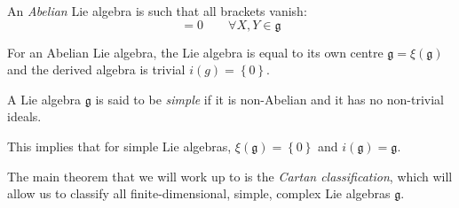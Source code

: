 \begin{definition}
  An \emph{Abelian} Lie algebra is such that all brackets vanish:
  \begin{equation}
    [X, Y] = 0 \qquad \forall X, Y \in \mathfrak{g}
  \end{equation}
\end{definition}

For an Abelian Lie algebra, the Lie algebra is equal to its own centre $\mathfrak{g} = \xi(\mathfrak{g})$ and the derived algebra is trivial $i(g) = \left\{ 0 \right\}$.

\begin{definition}[simple]
  A Lie algebra $\mathfrak{g}$ is said to be \emph{simple} if it is non-Abelian and it has no non-trivial ideals.
\end{definition}
This implies that for simple Lie algebras, $\xi(\mathfrak{g}) = \left\{ 0 \right\}$ and $i(\mathfrak{g}) = \mathfrak{g}$.

The main theorem that we will work up to is the \emph{Cartan classification}, which will allow us to classify all finite-dimensional, simple, complex Lie algebras $\mathfrak{g}$.
